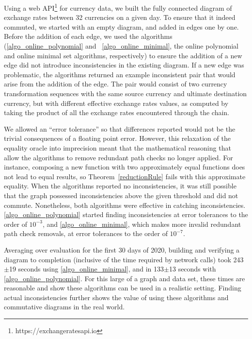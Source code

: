 \documentclass[sigplan]{acmart}
\begin{document}
Using a web API\footnote{https://exchangeratesapi.io} for currency data, we built the fully connected diagram of exchange rates between 32 currencies on a given day.
To ensure that it indeed commuted, we started with an empty diagram, and added in edges one by one.
Before the addition of each edge, we used the algorithms (\ref{algo_online_polynomial} and ~\ref{algo_online_minimal}, the online polynomial and online minimal set algorithms, respectively) to ensure the addition of a new edge did not introduce inconsistencies in the existing diagram.
If a new edge was problematic, the algorithms returned an example inconsistent pair that would arise from the addition of the edge.
The pair would consist of two currency transformation sequences with the same source currency and ultimate destination currency, but with different effective exchange rates values, as computed by taking the product of all the exchange rates encountered through the chain.

We allowed an ``error tolerance'' so that differences reported would not be the trivial consequences of a floating point error.
However, this relaxation of the equality oracle into imprecision meant that the mathematical reasoning that allow the algorithms to remove redundant path checks no longer applied.
For instance, composing a new function with two approximately equal functions does not lead to equal results, so Theorem~\ref{reductionRule} fails with this approximate equality.
When the algorithms reported no inconsistencies, it was still possible that the graph possessed inconsistencies above the given threshold and did not commute.
Nonetheless, both algorithms were effective in catching inconsistencies. \ref{algo_online_polynomial} started finding inconsistencies at error tolerances to the order of $10^{-3}$, and \ref{algo_online_minimal}, which makes more invalid redundant path check removals, at error tolerances to the order of $10^{-7}$.

Averaging over evaluation for the first 30 days of 2020, building and verifying a diagram to completion (inclusive of the time required by network calls) took 243$\pm$19 seconds using \ref{algo_online_minimal}, and in 133$\pm$13 seconds with \ref{algo_online_polynomial}.
For this large of a graph and data set, these times are reasonable and show these algorithms can be used in a realistic setting.
Finding actual inconsistencies further shows the value of using these algorithms and commutative diagrams in the real world.
\end{document}
